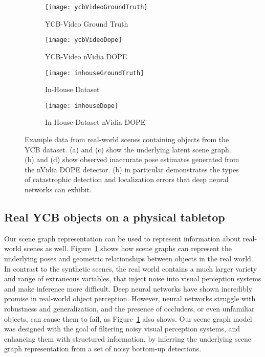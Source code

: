 \begin{figure}[t]
  \begin{subfigure}[b]{0.45\textwidth}
    \centering
    \texttt{[image: ycbVideoGroundTruth]}
    \caption{
      YCB-Video Ground Truth
    }
  \end{subfigure}%
  \begin{subfigure}[b]{0.45\textwidth}
    \centering
    \texttt{[image: ycbVideoDope]}
    \caption{
      YCB-Video nVidia DOPE
    }
  \end{subfigure}
  \begin{subfigure}[b]{0.45\textwidth}
    \centering
    \texttt{[image: inhouseGroundTruth]}
    \caption{
      In-House Dataset
    }
  \end{subfigure}%
  \begin{subfigure}[b]{0.45\textwidth}
    \centering
    \texttt{[image: inhouseDope]}
    \caption{
      In-House Dataset nVidia DOPE
    }
  \end{subfigure}
  \caption{
    Example data from real-world scenes containing objects from the YCB dataset.
    (a) and (c) show the underlying latent scene graph.
    (b) and (d) show observed inaccurate pose estimates generated from the nVidia DOPE detector. (b) in particular demonstrates the types of catastrophic detection and localization errors that deep neural networks can exhibit.
  }
  \label{fig:realWorldSceneGraphs}
\end{figure}
\subsection{Real YCB objects on a physical tabletop}
Our scene graph representation can be used to represent information about real-world scenes as well.
Figure~\ref{fig:realWorldSceneGraphs} shows how scene graphs can represent the underlying poses and geometric relationships between objects in the real world.
In contrast to the synthetic scenes, the real world contains a much larger variety and range of extraneous variables, that inject noise into visual perception systems and make inference more difficult.
Deep neural networks have shown incredibly promise in real-world object perception.
However, neural networks struggle with robustness and generalization, and the presence of occluders, or even unfamiliar objects, can cause them to fail, as Figure~\ref{fig:realWorldSceneGraphs} also shows.
Our scene graph model was designed with the goal of filtering noisy visual perception systems, and enhancing them with structured information, by inferring the underlying scene graph representation from a set of noisy bottom-up detections.
